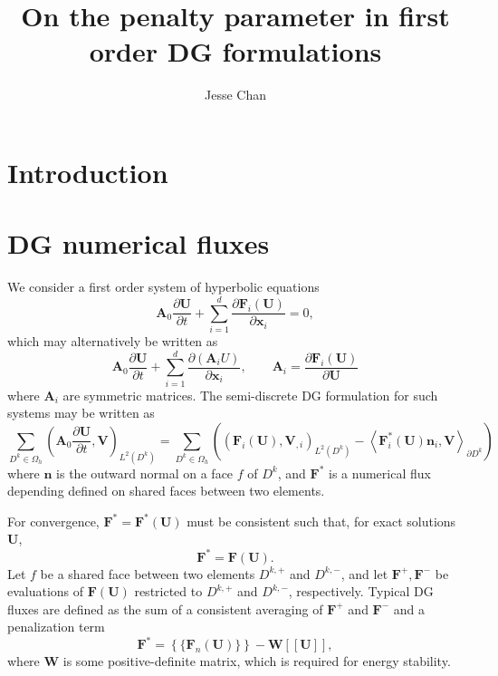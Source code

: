 \documentclass[10pt]{article}
\date{}
\author{Jesse Chan}
\title{On the penalty parameter in first order DG formulations}
\newcommand{\pd}[2]{\frac{\partial#1}{\partial#2}}
\newcommand{\LRp}[1]{\left( #1 \right)}
\newcommand{\LRs}[1]{\left[ #1 \right]}
\newcommand{\LRa}[1]{\left\langle #1 \right\rangle}
\newcommand{\LRc}[1]{\left\{ #1 \right\}}
\newcommand{\jump}[1] {\ensuremath{\LRs{\![#1]\!}}}
\newcommand{\avg}[1] {\ensuremath{\LRc{\!\{#1\}\!}}}
\newcommand{\Lk}{L^2\LRp{D^k}}
\newcommand{\Oh}{\Omega_h}
\begin{document}
\maketitle
\tableofcontents

%

\section{Introduction}

\section{DG numerical  fluxes}

We consider a first order system of hyperbolic equations
\[
\bm{A}_0\pd{\bm{U}}{t} + \sum_{i=1}^d \pd{\bm{F}_i(\bm{U})}{\bm{x}_i} = 0,
\]
which may alternatively be written as
\[
\bm{A}_0\pd{\bm{U}}{t} + \sum_{i=1}^d \pd{\LRp{\bm{A}_{i}U}}{\bm{x}_i}, \qquad \bm{A}_{i} = \pd{\bm{F}_i(\bm{U})}{\bm{U}}
\]
where $\bm{A}_{i}$ are symmetric matrices.  The semi-discrete DG formulation for such systems may be written as 
\[
\sum_{D^k \in \Oh} \LRp{\bm{A}_0\pd{\bm{U}}{t},\bm{V} }_{\Lk} = \sum_{D^k \in \Oh}\LRp{ \LRp{\bm{F}_i(\bm{U}), \bm{V}_{,i}}_{\Lk} - \LRa{\bm{F}_i^*(\bm{U})\bm{n}_i,\bm{V}}_{\partial D^k}}
\]
where $\bm{n}$ is the outward normal on a face $f$ of $D^k$, and $\bm{F^*}$ is a numerical flux depending defined on shared faces between two elements.  

For convergence, $\bm{F^*} = \bm{F^*}(\bm{U})$ must be consistent such that, for exact solutions $\bm{U}$, 
\[
\bm{F^*} = \bm{F}(\bm{U}).
\]
Let $f$ be a shared face between two elements $D^{k,+}$ and $D^{k,-}$, and let $\bm{F}^+, \bm{F}^-$ be evaluations of $\bm{F}(\bm{U})$ restricted to $D^{k,+}$ and $D^{k,-}$, respectively.  Typical DG fluxes are defined as the sum of a consistent averaging of $\bm{F}^+$ and $\bm{F}^-$ and a penalization term
\begin{equation}
\bm{F^*} = \avg{\bm{F}_n(\bm{U})} - \bm{W}\jump{\bm{U}},
\label{eq:flux}
\end{equation}
where $\bm{W}$ is some positive-definite matrix, which is required for energy stability.  
\end{document}
